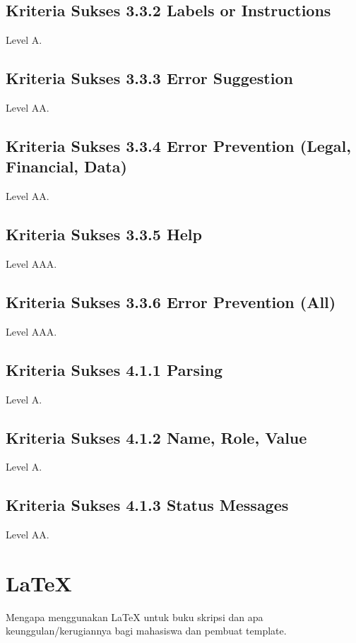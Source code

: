 \subsection{Kriteria Sukses 3.3.2 Labels or Instructions}
\label{sec:kriteria_3.3.2}
Level A.

\subsection{Kriteria Sukses 3.3.3 Error Suggestion}
\label{sec:kriteria_3.3.3}
Level AA.

\subsection{Kriteria Sukses 3.3.4 Error Prevention (Legal, Financial, Data)}
\label{sec:kriteria_3.3.4}
Level AA.

\subsection{Kriteria Sukses 3.3.5 Help}
\label{sec:kriteria_3.3.5}
Level AAA.

\subsection{Kriteria Sukses 3.3.6 Error Prevention (All)}
\label{sec:kriteria_3.3.6}
Level AAA.

\subsection{Kriteria Sukses 4.1.1 Parsing}
\label{sec:kriteria_4.1.1}
Level A.

\subsection{Kriteria Sukses 4.1.2 Name, Role, Value}
\label{sec:kriteria_4.1.2}
Level A.

\subsection{Kriteria Sukses 4.1.3 Status Messages}
\label{sec:kriteria_4.1.3}
Level AA.

\section{\LaTeX}
\label{sec:latex}

Mengapa menggunakan \LaTeX{} untuk buku skripsi dan apa keunggulan/kerugiannya bagi mahasiswa dan pembuat template. 

